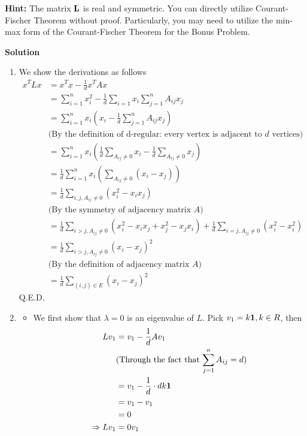 \documentclass[english,onecolumn]{IEEEtran}
\newcommand{\bL}{{\bf L}}
\begin{document}
\noindent\textbf{Hint:} 
The matrix $\bL$ is real and symmetric. 
	You can directly utilize Courant-Fischer Theorem without proof. Particularly, you may need to utilize the min-max form of the Courant-Fischer Theorem for the Bonus Problem.


\noindent
\textbf{Solution}
\begin{enumerate}
    \item We show the derivations as follows
    \begin{align*}
    	x^TLx & = x^Tx - \frac{1}{d} x^TAx\\
    	&= \sum_{i=1}^n x_i^2 -\frac{1}{d} \sum_{i=1}x_i \sum_{j=1}^nA_{ij}x_j\\
    	&= \sum_{i=1}^nx_i(x_i-\frac{1}{d}\sum_{j=1}^n A_{ij}x_j)\\
    	& \text{(By the definition of d-regular: every vertex is adjacent to $d$ vertices)}\\
    	&= \sum_{i=1}^nx_i(\frac{1}{d}\sum_{A_{ij} \ne 0}x_i - \frac{1}{d}\sum_{A_{ij}\ne 0}x_j)\\
    	& = \frac{1}{d}\sum_{i=1}^n x_i(\sum_{A_{ij}\ne 0}(x_i-x_j))\\
    	& = \frac{1}{d} \sum_{i,j,A_{ij}\ne 0}(x_i^2 - x_ix_j)\\
    	&\text{(By the symmetry of adjacency matrix $A$)}\\
    	& = \frac{1}{d} \sum_{i>j, A_{ij}\ne 0} (x_i^2 -x_ix_j + x_j^2 - x_jx_i) + \frac{1}{d}\sum_{i=j, A_{ij}\ne 0} (x_i^2 - x_i^2)\\
    	& = \frac{1}{d} \sum_{i>j, A_{ij}\ne 0} (x_i-x_j)^2\\
    	&\text{(By the definition of adjacency matrix $A$)}\\
    	& = \frac{1}{d} \sum_{(i,j)\in E} (x_i-x_j)^2
    \end{align*}
    Q.E.D.
    \item 
    \begin{itemize}
    	\item We first show that $\lambda =0$ is an eigenvalue of $L$. Pick $v_1 = k{\bf 1}, k\in R$, then
    		\begin{align*}
    			Lv_1 &= v_1 - \frac{1}{d} Av_1\\
    			&\text{(Through the fact that $\sum_{j=1}^n A_{ij} = d$)}\\
    			&= v_1 - \frac{1}{d}\cdot dk{\bf 1}\\
    			& = v_1 - v_1\\
    			& =0\\
    			\Rightarrow Lv_1 &= 0v_1

\end{align*}
\end{itemize}
\end{enumerate}
\end{document}
